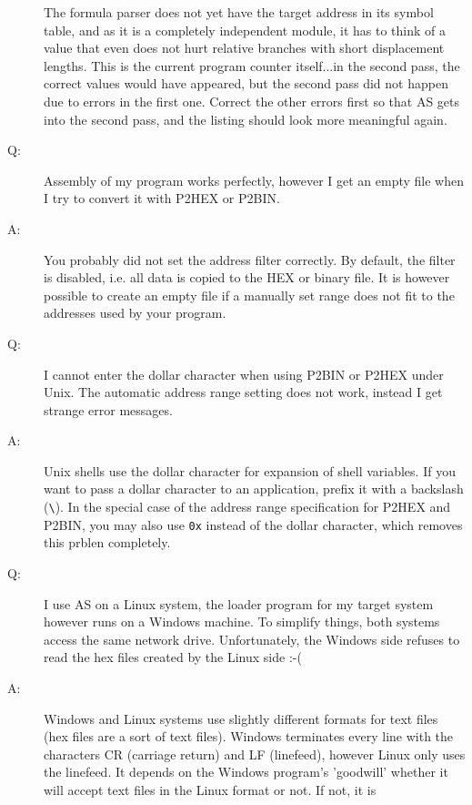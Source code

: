 \documentclass[12pt,twoside]{report}
\newcommand{\tty}[1]{{\tt #1}}
\newcommand{\asname}{{AS}}
\begin{document}
\begin{description}
{   The formula parser does not yet have the target address in its symbol
   table, and as it is a completely independent module, it has to think of
   a value that even does not hurt relative branches with short displacement
   lengths.  This is the current program counter itself...in the
   second pass, the correct values would have appeared, but the second
   pass did not happen due to errors in the first one.  Correct the
   other errors first so that \asname{} gets into the second pass, and the
   listing should look more meaningful again.}
\vspace{0.3cm}
\item[Q:]{Assembly of my program works perfectly, however I get an empty
   file when I try to convert it with P2HEX or P2BIN.}
\item[A:]{You probably did not set the address filter correctly.  By
   default, the filter is disabled, i.e. all data is copied to the
   HEX or binary file.  It is however possible to create an empty file
   if a manually set range does not fit to the addresses used by your
   program.}
\vspace{0.3cm}
\item[Q:]{I cannot enter the dollar character when using P2BIN or P2HEX
   under Unix.  The automatic address range setting does not work, instead
   I get strange error messages.}
\item[A:]{Unix shells use the dollar character for expansion of shell
   variables.  If you want to pass a dollar character to an application,
   prefix it with a backslash (\verb!\!).  In the special case of the
   address range specification for P2HEX and P2BIN, you may also use
   \tty{0x} instead of the dollar character, which removes this prblen
   completely.}
\item[Q:]{I use \asname{} on a Linux system, the loader program for my target
          system however runs on a Windows machine. To simplify things,
          both systems access the same network drive.  Unfortunately, the
          Windows side refuses to read the hex files created by the Linux
          side :-(}
\item[A:]{Windows and Linux systems use slightly different formats for
          text files (hex files are a sort of text files).  Windows
          terminates every line with the characters CR (carriage return)
          and LF (linefeed), however Linux only uses the linefeed.  It
          depends on the Windows program's 'goodwill' whether it will
          accept text files in the Linux format or not.  If not, it is
}
\end{description}
\end{document}
